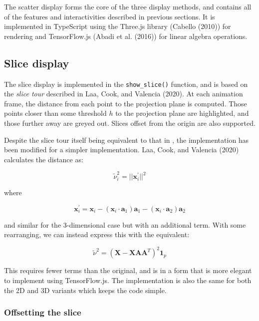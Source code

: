 The scatter display forms the core of the three display methods, and contains all of the features and interactivities described in previous sections. It is implemented in TypeScript using the Three.js library (Cabello (2010)) for rendering and TensorFlow.js (Abadi et al. (2016)) for linear algebra operations.

\hypertarget{slice-display}{%
\subsection{Slice display}\label{slice-display}}

The slice display is implemented in the \texttt{show\_slice()} function, and is based on the \emph{slice tour} described in Laa, Cook, and Valencia (2020). At each animation frame, the distance from each point to the projection plane is computed. Those points closer than some threshold \(h\) to the projection plane are highlighted, and those further away are greyed out. Slices offset from the origin are also supported.

Despite the slice tour itself being equivalent to that in , the implementation has been modified for a simpler implementation. Laa, Cook, and Valencia (2020) calculates the distance as:

\[
\tilde \nu_i^2 = ||\mathbf{x}_i^\prime||^2
\label{eq:nu}
\]

where

\begin{equation}
\mathbf{x}_i^\prime = \mathbf{x}_i - 
  (\mathbf{x}_i \cdot \mathbf{a}_1)\mathbf{a}_1 - 
  (\mathbf{x}_i \cdot \mathbf{a}_2)\mathbf{a}_2
\label{eq:xprime}
\end{equation}

and similar for the 3-dimensional case but with an additional term. With some rearranging, we can instead express this with the equivalent:

\begin{equation}
\tilde \nu^2 = (\mathbf{X} - \mathbf{XAA}^T)^2 \mathbf{1}_p
\label{eq:nu2}
\end{equation}

This requires fewer terms than the original, and is in a form that is more elegant to implement using TensorFlow.js. The implementation is also the same for both the 2D and 3D variants which keeps the code simple.

\hypertarget{offsetting-the-slice}{%
\subsubsection{Offsetting the slice}\label{offsetting-the-slice}}

